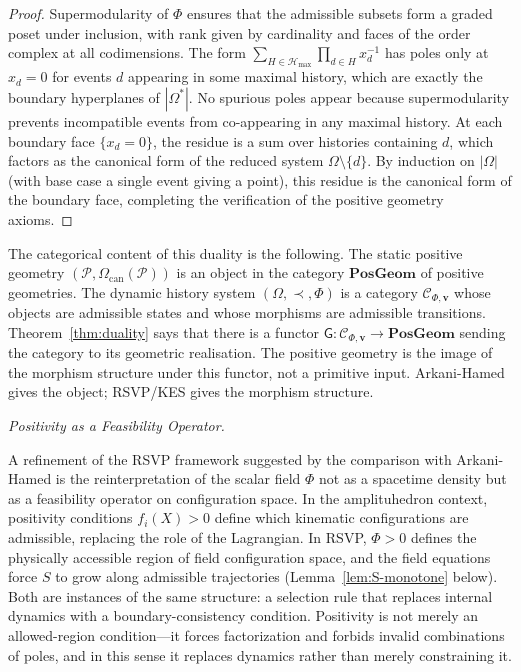 \documentclass[12pt, oneside]{amsart}
\theoremstyle{plain}
\theoremstyle{definition}
\theoremstyle{remark}
\newcommand{\Phif}{\Phi}
\newcommand{\Sf}{S}
\newcommand{\OmKS}{\Omega}
\newcommand{\CF}{\Omega_{\mathrm{can}}}
\newcommand{\PG}{\mathbf{PosGeom}}
\newcommand{\Ccat}{\mathcal{C}_{\Phi,\mathbf{v}}}
\newcommand{\Gfun}{\mathsf{G}}
\newcommand{\Hmax}{\mathcal{H}_{\max}}
\begin{document}
\begin{proof}
Supermodularity of $\Phif$ ensures that the admissible subsets form a graded poset under inclusion, with rank given by cardinality and faces of the order complex at all codimensions. The form $\sum_{H \in \Hmax} \prod_{d \in H} x_d^{-1}$ has poles only at $x_d = 0$ for events $d$ appearing in some maximal history, which are exactly the boundary hyperplanes of $|\OmKS^*|$. No spurious poles appear because supermodularity prevents incompatible events from co-appearing in any maximal history. At each boundary face $\{x_d = 0\}$, the residue is a sum over histories containing $d$, which factors as the canonical form of the reduced system $\OmKS \setminus \{d\}$. By induction on $|\OmKS|$ (with base case a single event giving a point), this residue is the canonical form of the boundary face, completing the verification of the positive geometry axioms.
\end{proof}

The categorical content of this duality is the following. The static positive geometry $(\mathcal{P}, \CF(\mathcal{P}))$ is an object in the category $\PG$ of positive geometries. The dynamic history system $(\OmKS, \prec, \Phif)$ is a category $\Ccat$ whose objects are admissible states and whose morphisms are admissible transitions. Theorem~\ref{thm:duality} says that there is a functor $\Gfun: \Ccat \to \PG$ sending the category to its geometric realisation. The positive geometry is the image of the morphism structure under this functor, not a primitive input. Arkani-Hamed gives the object; RSVP/KES gives the morphism structure.

\medskip\noindent\textit{Positivity as a Feasibility Operator.}

A refinement of the RSVP framework suggested by the comparison with Arkani-Hamed is the reinterpretation of the scalar field $\Phif$ not as a spacetime density but as a feasibility operator on configuration space. In the amplituhedron context, positivity conditions $f_i(X) > 0$ define which kinematic configurations are admissible, replacing the role of the Lagrangian. In RSVP, $\Phif > 0$ defines the physically accessible region of field configuration space, and the field equations force $\Sf$ to grow along admissible trajectories (Lemma~\ref{lem:S-monotone} below). Both are instances of the same structure: a selection rule that replaces internal dynamics with a boundary-consistency condition. Positivity is not merely an allowed-region condition---it forces factorization and forbids invalid combinations of poles, and in this sense it replaces dynamics rather than merely constraining it.
\end{document}
